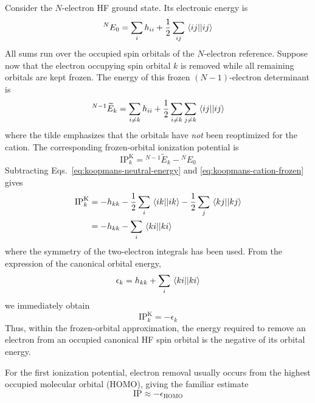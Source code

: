 \documentclass[11pt,a4paper,titlepage]{article}
\numberwithin{equation}{section}
\begin{document}
Consider the $N$-electron HF ground state. Its electronic energy is
\begin{equation}
  {}^N E_0
  =
  \sum_i h_{ii}
  +
  \frac{1}{2}
  \sum_{ij}
  \mel{ij}{}{ij}
  \label{eq:koopmans-neutral-energy}
\end{equation}
All sums run over the occupied spin orbitals of the $N$-electron reference.
Suppose now that the electron occupying spin orbital $k$ is removed while
all remaining orbitals are kept frozen. The energy of this frozen
$(N-1)$-electron determinant is
\begin{equation}
  {}^{N-1}\widetilde{E}_k
  =
  \sum_{i\ne k}h_{ii}
  +
  \frac{1}{2}
  \sum_{i\ne k}
  \sum_{j\ne k}
  \mel{ij}{}{ij}
  \label{eq:koopmans-cation-frozen}
\end{equation}
where the tilde emphasizes that the orbitals have \emph{not} been
reoptimized for the cation.
The corresponding frozen-orbital ionization potential is
\begin{equation}
  \text{IP}_k^\text{K}
  =
  {}^{N-1}\widetilde{E}_k
  -
  {}^N E_0
\end{equation}
Subtracting Eqs.~\eqref{eq:koopmans-neutral-energy} and
\eqref{eq:koopmans-cation-frozen} gives
\begin{equation}
\begin{split}
  \text{IP}_k^\text{K}
  &=
  -h_{kk}
  -
  \frac{1}{2}
  \sum_i
  \mel{ik}{}{ik}
  -
  \frac{1}{2}
  \sum_j
  \mel{kj}{}{kj}
  \\
  &=
  -h_{kk}
  -
  \sum_i
  \mel{ki}{}{ki}
\end{split}
\end{equation}
where the symmetry of the two-electron integrals has been used.
From the expression of the canonical orbital energy,
\begin{equation}
  \epsilon_k
  =
  h_{kk}
  +
  \sum_i
  \mel{ki}{}{ki}
\end{equation}
we immediately obtain
\begin{equation}
  \text{IP}_k^\text{K}
  =
  -\epsilon_k
  \label{eq:koopmans-ip}
\end{equation}
Thus, within the frozen-orbital approximation, the energy required to remove
an electron from an occupied canonical HF spin orbital is the negative of
its orbital energy.

For the first ionization potential, electron removal usually occurs from the
highest occupied molecular orbital (HOMO), giving the familiar estimate
\begin{equation}
  \text{IP}
  \approx
  -\epsilon_\text{HOMO}
\end{equation}
\end{document}
